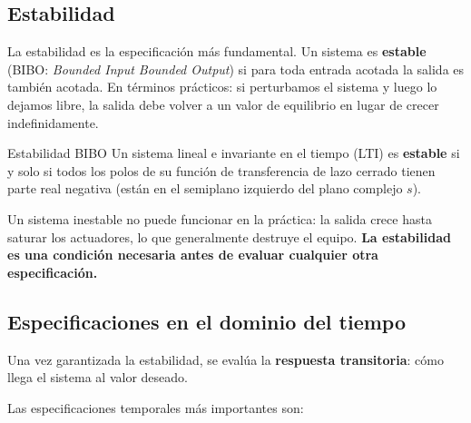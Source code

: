 \subsection{Estabilidad}

La estabilidad es la especificación más fundamental. Un sistema es
\textbf{estable} (BIBO: \textit{Bounded Input Bounded Output}) si para
toda entrada acotada la salida es también acotada. En términos prácticos:
si perturbamos el sistema y luego lo dejamos libre, la salida debe volver
a un valor de equilibrio en lugar de crecer indefinidamente.

\begin{definicion}{Estabilidad BIBO}
  Un sistema lineal e invariante en el tiempo (LTI) es \textbf{estable} si
  y solo si todos los polos de su función de transferencia de lazo cerrado
  tienen parte real negativa (están en el semiplano izquierdo del plano
  complejo $s$).
\end{definicion}

Un sistema inestable no puede funcionar en la práctica: la salida crece hasta
saturar los actuadores, lo que generalmente destruye el equipo. \textbf{La
estabilidad es una condición necesaria antes de evaluar cualquier otra
especificación.}

\subsection{Especificaciones en el dominio del tiempo}

Una vez garantizada la estabilidad, se evalúa la \textbf{respuesta transitoria}:
cómo llega el sistema al valor deseado.


Las especificaciones temporales más importantes son:


